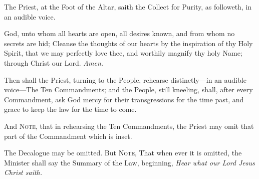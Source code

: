 \begin{rubric}
    The Priest, at the Foot of the Altar, saith the Collect for Purity, as followeth, in an audible voice.
\end{rubric}
 God, unto whom all hearts are open, all desires known, and from whom no secrets are hid; Cleanse the thoughts of our hearts by the inspiration of thy Holy Spirit, that we may perfectly love thee, and worthily magnify thy holy Name; through Christ our Lord. \textit{Amen.}
\begin{rubric}
Then shall the Priest, turning to the People, rehearse distinctly---in an audible voice---The Ten Commandments; and the People, still kneeling, shall, after every Commandment, ask God mercy for their transgressions for the time past, and grace to keep the law for the time to come.
\end{rubric}
\begin{rubric}
And \textsc{Note,} that in rehearsing the Ten Commandments, the Priest may omit that part of the Commandment which is inset.
\end{rubric}
\begin{rubric}
	The Decalogue may be omitted. But \textsc{Note,} That when ever it is omitted, the Minister shall say the Summary of the Law, beginning, \emph{Hear what our Lord Jesus Christ saith.}
\end{rubric}
